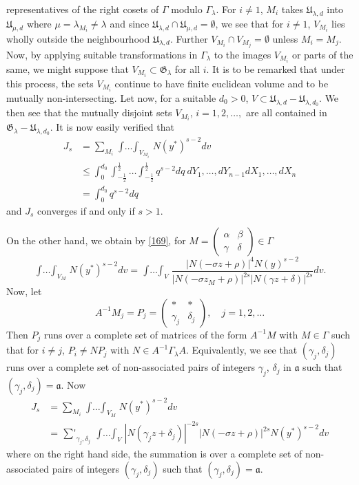   representatives of the right cosets of $\Gamma$ modulo
  $\Gamma_{\lambda}$. For $i\neq 1$, $M_{i}$ takes
  $\mathfrak{U}_{\lambda,d}$ into $\mathfrak{U}_{\mu,d}$ where
  $\mu=\lambda_{M_{i}}\neq \lambda$ and since
  $\mathfrak{U}_{\lambda,d}\cap \mathfrak{U}_{\mu,d}=\emptyset$, we
  see that for $i\neq 1$, $V_{M_{i}}$ lies wholly outside the
  neighbourhood $\mathfrak{U}_{\lambda,d}$. Further $V_{M_{i}}\cap
  V_{M_{j}}=\emptyset$ unless $M_{i}=M_{j}$. Now, by applying suitable
  transformations in $\Gamma_{\lambda}$ to the images $V_{M_{i}}$ or
  parts of the same, we might suppose that $V_{M_{i}}\subset
  \mathfrak{G}_{\lambda}$ for all $i$. It is to be remarked that under
  this process, the sets $V_{M_{i}}$ continue to have finite euclidean
  volume and to be mutually non-intersecting. Let now, for a suitable
  $d_{0}>0$, $V\subset
  \mathfrak{U}_{\lambda,d}-\mathfrak{U}_{\lambda,d_{0}}$. We then see
  that the mutually disjoint sets $V_{M_{i}}$, $i=1,2,\ldots,$ are all
  contained in
  $\mathfrak{G}_{\lambda}-\mathfrak{U}_{\lambda,d_{0}}$. It is now
  easily verified that
\begin{align*}
J_{s} &=
\sum_{M_{i}}\mathop{\int\ldots\int}_{V_{M_{i}}}N(y^{\ast})^{s-2}dv\\
&\leq
\int^{d_{0}}_{0}\int^{\frac{1}{2}}_{-\frac{1}{2}}\ldots\int^{\frac{1}{2}}_{-\frac{1}{2}}q^{s-2}dq\ dY_{1},\ldots,dY_{n-1}dX_{1},\ldots,dX_{n}\\
&= \int^{d_{0}}_{0}q^{s-2}dq
\end{align*}
and $J_{s}$ converges if and only if $s>1$.

On the other hand, we obtain by \eqref{169}, for
$M=\left(\begin{smallmatrix} \alpha & \beta\\ \gamma &\delta
\end{smallmatrix}\right)\in\Gamma$
$$
\mathop{\int\ldots\int}_{V_{M}}N(y^{\ast})^{s-2}dv=\mathop{\int\ldots\int}_{V}\frac{|N(-\sigma
  z+\rho)|^{4}N(y)^{s-2}}{|N(-\sigma z_{M}+\rho)|^{2s}|N(\gamma
  z+\delta)|^{2s}}dv. 
$$
Now, let
$$
A^{-1}M_{j}=P_{j}=
\begin{pmatrix}
\ast & \ast\\
\gamma_{j} & \delta_{j}
\end{pmatrix},\quad 
j=1,2,\ldots
$$
Then $P_{j}$ runs over a complete set of matrices of the form
$A^{-1}M$ with $M\in\Gamma$ such that for $i\neq j$, $P_{i}\neq
NP_{j}$ with $N\in A^{-1}\Gamma_{\lambda}A$. Equivalently, we see that
$(\gamma_{j},\delta_{j})$ runs over a complete set of non-associated
pairs of integers $\gamma_{j}$, $\delta_{j}$ in $\mathfrak{a}$ such
that $(\gamma_{j},\delta_{j})=\mathfrak{a}$. Now 
\begin{align*}
J_{s} &=
\sum_{M_{i}}\mathop{\int\ldots\int}_{V_{M}}N(y^{\ast})^{s-2}dv\\
&=
\mathop{{\sum}'}_{\gamma_{j},\delta_{j}}\mathop{\int\ldots\int}_{V}|N(\gamma_{j}z+\delta_{j})|^{-2s}|N(-\sigma z+\rho)|^{2s}N(y^{\ast})^{s-2}dv
\end{align*}\pageoriginale
where on the right hand side, the summation is over a complete set of
non-associated pairs of integers $(\gamma_{j},\delta_{j})$ such that
$(\gamma_{j},\delta_{j})=\mathfrak{a}$.

